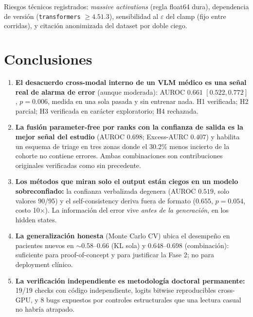 \documentclass[12pt,a4paper]{article}
\begin{document}
Riesgos técnicos registrados: \emph{massive activations} (regla float64
dura), dependencia de versión (\texttt{transformers} $\geq 4.51.3$),
sensibilidad al $\varepsilon$ del clamp (fijo entre corridas), y citación
anonimizada del dataset por doble ciego.

\section{Conclusiones}
\label{sec:conclusiones}

\begin{enumerate}[leftmargin=1.6em]
    \item \textbf{El desacuerdo cross-modal interno de un VLM médico es
    una señal real de alarma de error} (aunque moderada): AUROC $0.661$
    $[0.522, 0.772]$, $p = 0.006$, medida en una sola pasada y sin
    entrenar nada. H1 verificada; H2 parcial; H3 verificada en carácter
    exploratorio; H4 rechazada.
    \item \textbf{La fusión parameter-free por ranks con la confianza de
    salida es la mejor señal del estudio} (AUROC $0.698$; Excess-AURC
    $0.407$) y habilita un esquema de triage en tres zonas donde el 30.2\%
    menos incierto de la cohorte no contiene errores. Ambas combinaciones
    son contribuciones originales verificadas como sin precedente.
    \item \textbf{Los métodos que miran solo el output están ciegos en un
    modelo sobreconfiado:} la confianza verbalizada degenera (AUROC
    $0.519$, solo valores 90/95) y el self-consistency deriva fuera de
    formato ($0.655$, $p = 0.054$, costo 10$\times$). La información del
    error vive \emph{antes de la generación}, en los hidden states.
    \item \textbf{La generalización honesta} (Monte Carlo CV) ubica el
    desempeño en pacientes nuevos en $\sim$0.58--0.66 (KL sola) y
    0.648--0.698 (combinación): suficiente para proof-of-concept y para
    justificar la Fase 2; no para deployment clínico.
    \item \textbf{La verificación independiente es metodología doctoral
    permanente:} 19/19 checks con código independiente, logits bitwise
    reproducibles cross-GPU, y 8 bugs expuestos por controles
    estructurales que una lectura casual no habría atrapado.
\end{enumerate}
\end{document}
